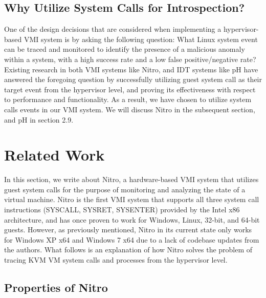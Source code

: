 \documentclass{report}
\begin{document}
\begin{spacing}{1.5}
\subsection{Why Utilize System Calls for Introspection?}

{\large
One of the design decisions that are considered when implementing a hypervisor-based VMI system is by asking the following question: What Linux system event can be traced and monitored to identify the presence of a malicious anomaly within a system, with a high success rate and a low false positive/negative rate? Existing research in both VMI systems like Nitro, and IDT systems like pH have answered the foregoing question by successfully utilizing guest system call as their target event from the hypervisor level, and proving its effectiveness with respect to performance and functionality. As a result, we have chosen to utilize system calls events in our VMI system. We will discuss Nitro in the subsequent section, and pH in section 2.9.
\newline
}
















\section{Related Work}

{\large
In this section, we write about Nitro, a hardware-based VMI system that utilizes guest system calls for the purpose of monitoring and analyzing the state of a virtual machine. Nitro is the first VMI system that supports all three system call instructions (SYSCALL, SYSRET, SYSENTER) provided by the Intel x86 architecture, and has once proven to work for Windows, Linux, 32-bit, and 64-bit guests. However, as previously mentioned, Nitro in its current state only works for Windows XP x64 and Windows 7 x64 due to a lack of codebase updates from the authors. What follows is an explanation of how Nitro solves the problem of tracing KVM VM system calls and processes from the hypervisor level.
\newline
}

\subsection{Properties of Nitro}





\end{spacing}
\end{document}
